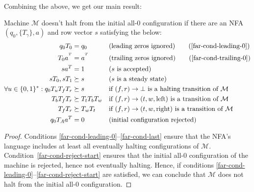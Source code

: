 Combining the above, we get our main result:

\begin{theorem}\normalfont
  \label{far-main-theorem}
  Machine $\mathcal{M}$ doesn't halt from the initial all-0 configuration if there are an NFA $(q_0, \{T_\gamma\}, a)$ and row vector $s$ satisfying the below:
  \begin{align}
    \label{far-cond-first}
    q_0 T_0                                & = q_0
                                           &                     & \text{(leading zeros ignored)}
    \tag{\ref{far-cond-leading-0}}
    \\
    T_0a^{\T}                              & = a^{\T}
                                           &                     & \text{(trailing zeros ignored)}
    \tag{\ref{far-cond-trailing-0}}
    \\
    sa\T                                   & = 1
                                           &                     & \text{($s$ is accepted)}
    \label{far-cond-ass-accepted}
    \\
    sT_0,sT_1                              & \succeq s
                                           &                     & \text{($s$ is a steady state)}
    \label{far-cond-ass-steady}
    \\
    \forall u\in\{0, 1\}^*: q_0T_u T_f T_r & \succeq s
                                           &                     & \text{if $(f,r) \to \bot$ is a halting transition of $\mathcal{M}$}
    \label{far-cond-halt}
    \\
    T_b T_f T_r                            & \succeq T_t T_b T_w
                                           &                     & \text{if $(f,r) \to (t,w,\text{left})$ is a transition of $\mathcal{M}$}
    \label{far-cond-left}
    \\
    T_f T_r                                & \succeq T_w T_t
                                           &                     & \text{if $(f,r) \to (t,w,\text{right})$ is a transition of $\mathcal{M}$}
    \label{far-cond-last}
    \\
    q_0 T_A a\T                            & = 0
                                           &                     & \text{(initial configuration rejected)}
    \label{far-cond-reject-start}
  \end{align}
\end{theorem}
\begin{proof}
  Conditions \eqref{far-cond-leading-0}--\eqref{far-cond-last} ensure that the NFA's language includes at least all eventually halting configurations of $\mathcal{M}$. Condition~\eqref{far-cond-reject-start} ensures that the initial all-0 configuration of the machine is rejected, hence not eventually halting. Hence, if conditions \eqref{far-cond-leading-0}--\eqref{far-cond-reject-start} are satisfied, we can conclude that $\mathcal{M}$ does not halt from the initial all-0 configuration.
\end{proof}


